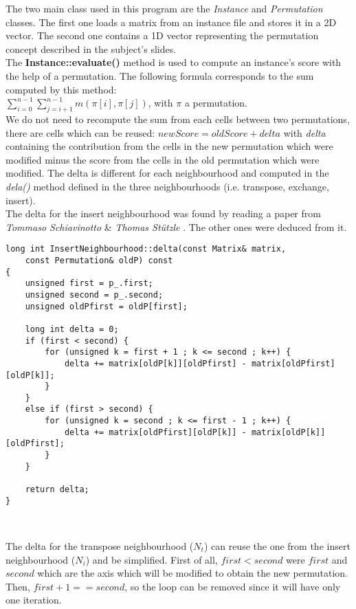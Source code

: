 The two main class used in this program are the \emph{Instance} and
\emph{Permutation} classes. The first one loads a matrix from an instance file
and stores it in a 2D vector. The second one contains a 1D vector representing
the permutation concept described in the subject's slides.\\

The \textbf{Instance::evaluate()} method is used to compute an instance's score
with the help of a permutation. The following formula corresponds to the sum
computed by this method:\\
$\sum_{i=0}^{n-1} \sum_{j=i+1}^{n-1} m(\pi[i], \pi[j])$, with $\pi$ a
permutation.\\

We do not need to recompute the sum from each cells between two permutations,
there are cells which can be reused: $newScore = oldScore + delta$
with \emph{delta} containing the contribution from the cells in the new
permutation which were modified minus the score from the cells in the old
permutation which were modified. The delta is different for each neighbourhood
and computed in the \emph{dela()} method defined in the three neighbourhoods
(i.e. transpose, exchange, insert).\\

The delta for the insert neighbourhood was found by reading a paper from
\emph{Tommaso Schiavinotto} \& \emph{Thomas Stützle} \cite{cite:lopPaper}.
The other ones were deduced from it.\\

\begin{lstlisting}
long int InsertNeighbourhood::delta(const Matrix& matrix,
    const Permutation& oldP) const
{
    unsigned first = p_.first;
    unsigned second = p_.second;
    unsigned oldPfirst = oldP[first];
    
    long int delta = 0;
    if (first < second) {
        for (unsigned k = first + 1 ; k <= second ; k++) {
            delta += matrix[oldP[k]][oldPfirst] - matrix[oldPfirst][oldP[k]];
        }
    }
    else if (first > second) {
        for (unsigned k = second ; k <= first - 1 ; k++) {
            delta += matrix[oldPfirst][oldP[k]] - matrix[oldP[k]][oldPfirst];
        }
    }
    
    return delta;
}
\end{lstlisting}
\

The delta for the transpose neighbourhood ($N_t$) can reuse the one from the
insert neighbourhood ($N_i$) and be simplified. First of all, $first < second$
were $first$ and $second$ which are the axis which will be modified to obtain
the new permutation. Then, $first + 1 == second$, so the loop can be removed
since it will have only one iteration.\\

